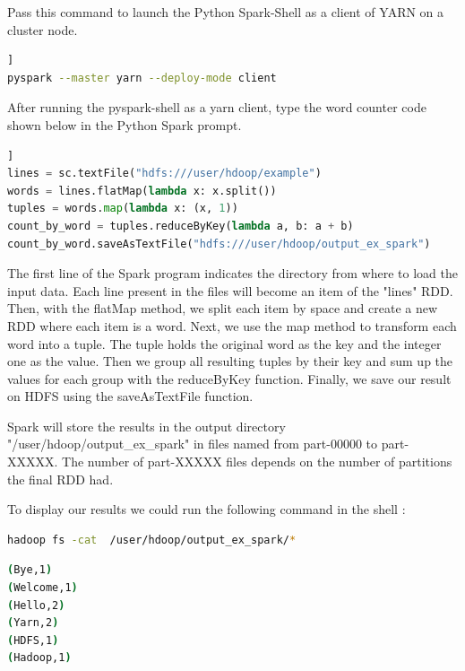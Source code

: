 \documentclass[12pt,english]{book}
\begin{document}
Pass this command to launch the Python Spark-Shell as a client of YARN on a cluster node.

\begin{lstlisting}[language=bash, frame=single, basicstyle=\footnotesize, breaklines=true, postbreak=\mbox{\textcolor{red}{$\hookrightarrow$}\space}]]
pyspark --master yarn --deploy-mode client
\end{lstlisting}

After running the pyspark-shell as a yarn client, type the word counter code shown below in the Python Spark prompt.

\begin{lstlisting}[language=python, frame=single, basicstyle=\footnotesize, breaklines=true, postbreak=\mbox{\textcolor{red}{$\hookrightarrow$}\space}]]
lines = sc.textFile("hdfs:///user/hdoop/example")
words = lines.flatMap(lambda x: x.split())
tuples = words.map(lambda x: (x, 1))
count_by_word = tuples.reduceByKey(lambda a, b: a + b)
count_by_word.saveAsTextFile("hdfs:///user/hdoop/output_ex_spark")
\end{lstlisting}

The first line of the Spark program indicates the directory from where to load the input data.
Each line present in the files will become an item of the "lines" RDD.
Then, with the flatMap method, we split each item by space and create a new  RDD where each item is a word.
Next, we use the map method to transform each word into a tuple.
The tuple holds the original word as the key and the integer one as the value.
Then we group all resulting tuples by their key and sum up the values for each group with the reduceByKey function.
Finally, we save our result on HDFS using the saveAsTextFile function.

Spark will store the results in the output directory "/user/hdoop/output\_ex\_spark" in files named from part-00000 to part-XXXXX.
The number of part-XXXXX files depends on the number of partitions the final RDD had.

To display our results we could run the following command in the shell :

\begin{lstlisting}[language=bash, frame=single, basicstyle=\footnotesize]
hadoop fs -cat  /user/hdoop/output_ex_spark/*
\end{lstlisting}

\begin{lstlisting}[language=bash, frame=single, basicstyle=\footnotesize]
(Bye,1)
(Welcome,1)
(Hello,2)
(Yarn,2)
(HDFS,1)
(Hadoop,1)
\end{lstlisting}
\end{document}
